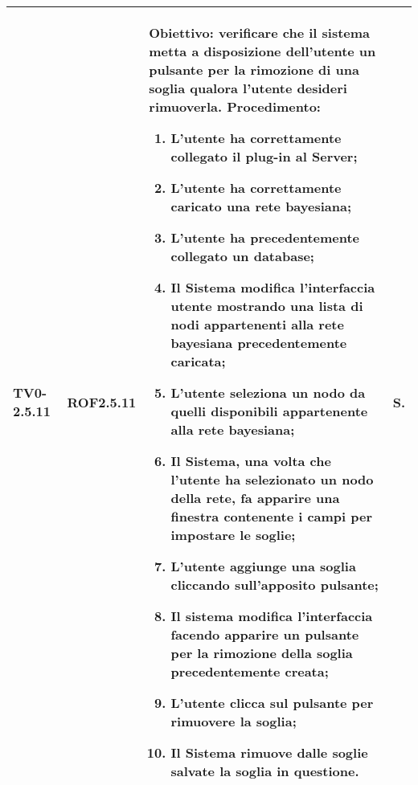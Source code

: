 \begin{longtable}{|C{.15\textwidth}|C{.13\textwidth}|m{.65\textwidth}|C{.08\textwidth}|}
TV0-2.5.11 & ROF2.5.11  &
	\textbf{Obiettivo}: verificare che il sistema metta a disposizione dell'utente un pulsante per la rimozione di una soglia qualora l'utente desideri rimuoverla. \newline
	\textbf{Procedimento}:
	\begin{enumerate}
		\item L'utente ha correttamente collegato il plug-in al Server;
		\item L'utente ha correttamente caricato una rete bayesiana;
		\item L'utente ha precedentemente collegato un database;
		\item Il Sistema modifica l'interfaccia utente mostrando una lista di nodi appartenenti alla rete bayesiana precedentemente caricata;
		\item L'utente seleziona un nodo da quelli disponibili appartenente alla rete bayesiana;
		\item Il Sistema, una volta che l'utente ha selezionato un nodo della rete, fa apparire una finestra contenente i campi per impostare le soglie;
		\item L'utente aggiunge una soglia cliccando sull'apposito pulsante;
		\item Il sistema modifica l'interfaccia facendo apparire un pulsante per la rimozione della soglia precedentemente creata;
		\item L'utente clicca sul pulsante per rimuovere la soglia;
		\item Il Sistema rimuove dalle soglie salvate la soglia in questione.
	\end{enumerate}
	& S. \\
\hline


\end{longtable}
